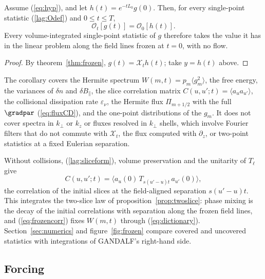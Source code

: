 \begin{corollary}\label{cor:singlepoint}
Assume (\ref{eq:hyp}), and let $h(t)=e^{-tL_0}g(0)$. Then, for every single-point statistic (\ref{lag:Odef}) and $0\le t\le T$,
\begin{equation*}
  \mathcal O_t[g(t)]=\mathcal O_0[h(t)] .
\end{equation*}
Every volume-integrated single-point statistic of $g$ therefore takes the value it has in the linear problem along the field lines frozen at $t=0$, with no flow.
\end{corollary}

\begin{proof}
By theorem~\ref{thm:frozen}, $g(t)=\mathcal X_th(t)$; take $y=h(t)$ above.
\end{proof}

The corollary covers the Hermite spectrum $W(m,t)=p_m\langle g_m^2\rangle$, the free energy, the variances of $\delta n$ and $\delta B_\parallel$, the slice correlation matrix $C(u,u';t)=\langle a_ua_{u'}\rangle$, the collisional dissipation rate $\varepsilon_\nu$, the Hermite flux $\Pi_{m+1/2}$ with the full $\gradpar$ (\ref{eq:fluxCD}), and the one-point distributions of the $g_m$. It does not cover spectra in $k_\perp$ or $k_z$ or fluxes resolved in $k_\perp$ shells, which involve Fourier filters that do not commute with $\mathcal X_t$, the flux computed with $\partial_z$, or two-point statistics at a fixed Eulerian separation.

Without collisions, (\ref{lag:sliceform}), volume preservation and the unitarity of $T_\ell$ give
\begin{equation}\label{eq:frozencorr}
  C(u,u';t)=\big\langle a_u(0)\,T_{s(u'-u)t}\,a_{u'}(0)\big\rangle ,
\end{equation}
the correlation of the initial slices at the field-aligned separation $s(u'-u)t$. This integrates the two-slice law of proposition~\ref{prop:twoslice}: phase mixing is the decay of the initial correlations with separation along the frozen field lines, and (\ref{eq:frozencorr}) fixes $W(m,t)$ through (\ref{eq:dictionary}). Section~\ref{sec:numerics} and figure~\ref{fig:frozen} compare covered and uncovered statistics with integrations of GANDALF's right-hand side.

\subsection{Forcing}

